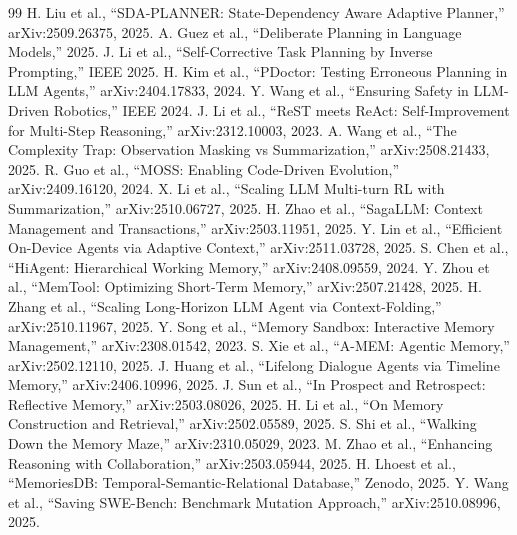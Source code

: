 \documentclass[12pt,a4paper]{report}
\begin{document}
\begin{thebibliography}{99}
 H. Liu et al., ``SDA-PLANNER: State-Dependency Aware Adaptive Planner,'' arXiv:2509.26375, 2025.
 A. Guez et al., ``Deliberate Planning in Language Models,'' 2025.
 J. Li et al., ``Self-Corrective Task Planning by Inverse Prompting,'' IEEE 2025.
 H. Kim et al., ``PDoctor: Testing Erroneous Planning in LLM Agents,'' arXiv:2404.17833, 2024.
 Y. Wang et al., ``Ensuring Safety in LLM-Driven Robotics,'' IEEE 2024.
 J. Li et al., ``ReST meets ReAct: Self-Improvement for Multi-Step Reasoning,'' arXiv:2312.10003, 2023.
 A. Wang et al., ``The Complexity Trap: Observation Masking vs Summarization,'' arXiv:2508.21433, 2025.
 R. Guo et al., ``MOSS: Enabling Code-Driven Evolution,'' arXiv:2409.16120, 2024.
 X. Li et al., ``Scaling LLM Multi-turn RL with Summarization,'' arXiv:2510.06727, 2025.
 H. Zhao et al., ``SagaLLM: Context Management and Transactions,'' arXiv:2503.11951, 2025.
 Y. Lin et al., ``Efficient On-Device Agents via Adaptive Context,'' arXiv:2511.03728, 2025.
 S. Chen et al., ``HiAgent: Hierarchical Working Memory,'' arXiv:2408.09559, 2024.
 Y. Zhou et al., ``MemTool: Optimizing Short-Term Memory,'' arXiv:2507.21428, 2025.
 H. Zhang et al., ``Scaling Long-Horizon LLM Agent via Context-Folding,'' arXiv:2510.11967, 2025.
 Y. Song et al., ``Memory Sandbox: Interactive Memory Management,'' arXiv:2308.01542, 2023.
 S. Xie et al., ``A-MEM: Agentic Memory,'' arXiv:2502.12110, 2025.
 J. Huang et al., ``Lifelong Dialogue Agents via Timeline Memory,'' arXiv:2406.10996, 2025.
 J. Sun et al., ``In Prospect and Retrospect: Reflective Memory,'' arXiv:2503.08026, 2025.
 H. Li et al., ``On Memory Construction and Retrieval,'' arXiv:2502.05589, 2025.
 S. Shi et al., ``Walking Down the Memory Maze,'' arXiv:2310.05029, 2023.
 M. Zhao et al., ``Enhancing Reasoning with Collaboration,'' arXiv:2503.05944, 2025.
 H. Lhoest et al., ``MemoriesDB: Temporal-Semantic-Relational Database,'' Zenodo, 2025.
 Y. Wang et al., ``Saving SWE-Bench: Benchmark Mutation Approach,'' arXiv:2510.08996, 2025.

\end{thebibliography}
\end{document}
